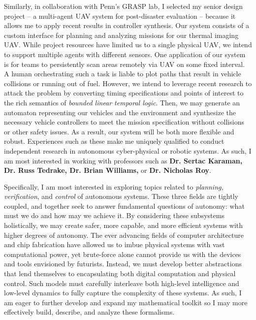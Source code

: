 \documentclass[]{letter}
\begin{document}
Similarly, in collaboration with Penn's GRASP lab, I selected my senior design project -- a multi-agent UAV system for post-disaster evaluation -- because it allows me to apply recent results in controller synthesis. Our system consists of a custom interface for planning and analyzing missions for our thermal imaging UAV. While project resources have limited us to a single physical UAV, we intend to support multiple agents with different sensors. One application of our system is for teams to persistently scan areas remotely via UAV on some fixed interval. A human orchestrating such a task is liable to plot paths that result in vehicle collisions or running out of fuel. However, we intend to leverage recent research to attack the problem by converting timing specifications and points of interest to the rich semantics of \emph{bounded linear temporal logic}. Then, we may generate an automaton representing our vehicles and the environment and synthesize the necessary vehicle controllers to meet the mission specification without collisions or other safety issues. As a result, our system will be both more flexible and robust. Experiences such as these make me uniquely qualified to conduct independent research in autonomous cyber-physical or robotic systems. As such, I am most interested in working with professors such as {\bf{Dr. Sertac Karaman, Dr. Russ Tedrake, Dr. Brian Williams,}} or {\bfseries{Dr. Nicholas Roy}}.

Specifically, I am most interested in exploring topics related to \emph{planning, verification}, and \emph{control} of autonomous systems. These three fields are tightly coupled, and together seek to answer fundamental questions of autonomy: what must we do and how may we achieve it. By considering these subsystems holistically, we may create safer, more capable, and more efficient systems with higher degrees of autonomy. The ever advancing fields of computer architecture and chip fabrication have allowed us to imbue physical systems with vast computational power, yet brute-force alone cannot provide us with the devices and tools envisioned by futurists. Instead, we must develop better abstractions that lend themselves to encapsulating both digital computation and physical control. Such models must carefully interleave both high-level intelligence and low-level dynamics to fully capture the complexity of these systems. As such, I am eager to further develop and expand my mathematical toolkit so I may more effectively build, describe, and analyze these formalisms.
\end{document}
